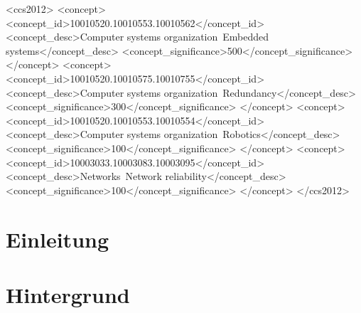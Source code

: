\documentclass{sig-alternate-05-2015}
\begin{document}
\maketitle
\begin{abstract}
\end{abstract}


%
%
\begin{CCSXML}
<ccs2012>
 <concept>
  <concept_id>10010520.10010553.10010562</concept_id>
  <concept_desc>Computer systems organization~Embedded systems</concept_desc>
  <concept_significance>500</concept_significance>
 </concept>
 <concept>
  <concept_id>10010520.10010575.10010755</concept_id>
  <concept_desc>Computer systems organization~Redundancy</concept_desc>
  <concept_significance>300</concept_significance>
 </concept>
 <concept>
  <concept_id>10010520.10010553.10010554</concept_id>
  <concept_desc>Computer systems organization~Robotics</concept_desc>
  <concept_significance>100</concept_significance>
 </concept>
 <concept>
  <concept_id>10003033.10003083.10003095</concept_id>
  <concept_desc>Networks~Network reliability</concept_desc>
  <concept_significance>100</concept_significance>
 </concept>
</ccs2012>  
\end{CCSXML}



%
%

%
%
\printccsdesc



\section{Einleitung}
\section{Hintergrund}
\end{document}
